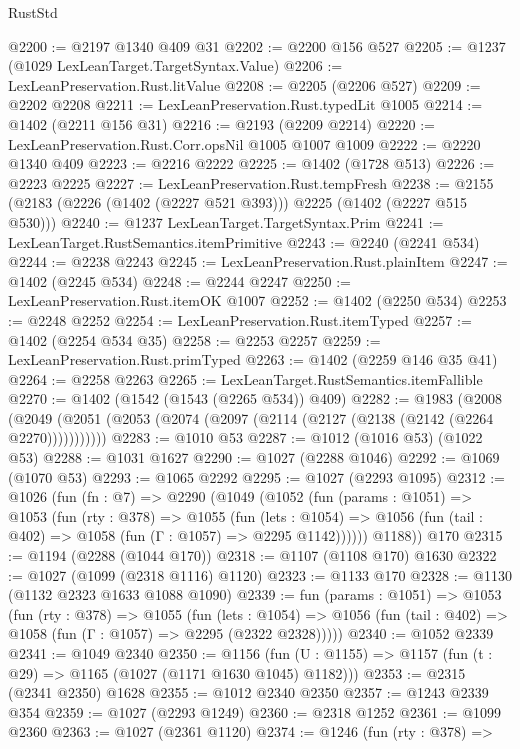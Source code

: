\begin{lexlean}{RustStd}
\begin{coremodule}
@2200 := @2197 @1340 @409 @31
@2202 := @2200 @156 @527
@2205 := @1237 (@1029 LexLeanTarget.TargetSyntax.Value)
@2206 := LexLeanPreservation.Rust.litValue
@2208 := @2205 (@2206 @527)
@2209 := @2202 @2208
@2211 := LexLeanPreservation.Rust.typedLit @1005
@2214 := @1402 (@2211 @156 @31)
@2216 := @2193 (@2209 @2214)
@2220 := LexLeanPreservation.Rust.Corr.opsNil @1005 @1007 @1009
@2222 := @2220 @1340 @409
@2223 := @2216 @2222
@2225 := @1402 (@1728 @513)
@2226 := @2223 @2225
@2227 := LexLeanPreservation.Rust.tempFresh
@2238 := @2155 (@2183 (@2226 (@1402 (@2227 @521 @393))) @2225 (@1402 (@2227 @515 @530)))
@2240 := @1237 LexLeanTarget.TargetSyntax.Prim
@2241 := LexLeanTarget.RustSemantics.itemPrimitive
@2243 := @2240 (@2241 @534)
@2244 := @2238 @2243
@2245 := LexLeanPreservation.Rust.plainItem
@2247 := @1402 (@2245 @534)
@2248 := @2244 @2247
@2250 := LexLeanPreservation.Rust.itemOK @1007
@2252 := @1402 (@2250 @534)
@2253 := @2248 @2252
@2254 := LexLeanPreservation.Rust.itemTyped
@2257 := @1402 (@2254 @534 @35)
@2258 := @2253 @2257
@2259 := LexLeanPreservation.Rust.primTyped
@2263 := @1402 (@2259 @146 @35 @41)
@2264 := @2258 @2263
@2265 := LexLeanTarget.RustSemantics.itemFallible
@2270 := @1402 (@1542 (@1543 (@2265 @534)) @409)
@2282 := @1983
    (@2008 (@2049 (@2051 (@2053 (@2074 (@2097 (@2114 (@2127 (@2138 (@2142 (@2264 @2270)))))))))))
@2283 := @1010 @53
@2287 := @1012 (@1016 @53) (@1022 @53)
@2288 := @1031 @1627
@2290 := @1027 (@2288 @1046)
@2292 := @1069 (@1070 @53)
@2293 := @1065 @2292
@2295 := @1027 (@2293 @1095)
@2312 := @1026
    (fun (fn : @7) =>
    @2290
      (@1049
        (@1052
          (fun (params : @1051) =>
          @1053
            (fun (rty : @378) =>
            @1055
              (fun (lets : @1054) =>
              @1056 (fun (tail : @402) => @1058 (fun (Γ : @1057) => @2295 @1142))))))
        @1188))
    @170
@2315 := @1194 (@2288 (@1044 @170))
@2318 := @1107 (@1108 @170) @1630
@2322 := @1027 (@1099 (@2318 @1116) @1120)
@2323 := @1133 @170
@2328 := @1130 (@1132 @2323 @1633 @1088 @1090)
@2339 := fun (params : @1051) =>
  @1053
    (fun (rty : @378) =>
    @1055
      (fun (lets : @1054) =>
      @1056 (fun (tail : @402) => @1058 (fun (Γ : @1057) => @2295 (@2322 @2328)))))
@2340 := @1052 @2339
@2341 := @1049 @2340
@2350 := @1156 (fun (U : @1155) => @1157 (fun (t : @29) => @1165 (@1027 (@1171 @1630 @1045) @1182)))
@2353 := @2315 (@2341 @2350) @1628
@2355 := @1012 @2340 @2350
@2357 := @1243 @2339 @354
@2359 := @1027 (@2293 @1249)
@2360 := @2318 @1252
@2361 := @1099 @2360
@2363 := @1027 (@2361 @1120)
@2374 := @1246
    (fun (rty : @378) =>

\end{coremodule}
\end{lexlean}
